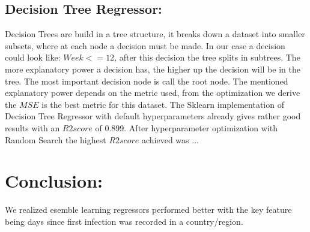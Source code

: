 \documentclass{article}
\begin{document}
\subsection{Decision Tree Regressor:}
Decision Trees are build in a tree structure, it breaks down a dataset into smaller subsets, where at each node a decision must be made. In our case a decision could look like: $Week <= 12$, after this decision the tree splits in subtrees. The more explanatory power a decision has, the higher up the decision will be in the tree. The most important decision node is call the root node. The mentioned explanatory power depends on the metric used, from the optimization we derive the $MSE$ is the best metric for this dataset. 
The Sklearn implementation of Decision Tree Regressor with default hyperparameters already gives rather good results with an $R2 score$ of 0.899. After hyperparameter optimization with Random Search the highest $R2 score$ achieved was ... 




\section{Conclusion:}
We realized esemble learning regressors performed better with the key feature being days since first infection was recorded in a country/region.
\end{document}
